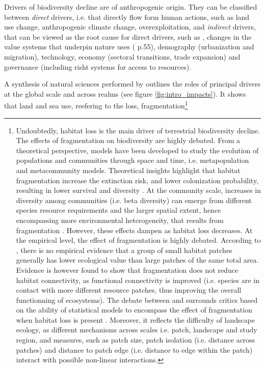 Drivers of biodiversity decline are of anthropogenic origin. They can be classified between \textit{direct} drivers, i.e. that directly flow form human actions, such as land use change, anthropogenic climate change, overexploitation, and \textit{indirect} drivers, that can be viewed as the root cause for direct drivers, such as  , changes in the value systems that underpin nature uses (\cite{ipbes_2022_6417333} p.55), demography (urbanization and migration), technology, economy (sectoral transitions, trade expansion) and governance (including risht systems for access to resources).

A synthesis of natural sciences performed by \cite{ipbes_2022_6417333} outlines the roles of principal drivers at the global scale and across realms (see figure \ref{fig:intro_impacts}).
It shows that land and sea use, reefering to the loss, fragmentation\footnote{Undoubtedly, habitat loss is the main driver of terrestrial biodiversity decline. The effects of fragmentation on biodiversity are highly debated. From a theoretical perspective, models have been developed to study the evolution of populations and communities through space and time, i.e. metapopulation and metacommunity models. Theoretical insights highlight that habitat fragmentation increase the extinction risk, and lower colonization probability, resulting in lower survival and diversity \citep{adler_persistence_1994,hill_habitat_1999, thompson_loss_2017}. At the community scale, increases in diversity among communities (i.e. beta diversity) can emerge from different species resource requirements and the larger spatial extent, hence encompassing more environmental heterogeneity, that results from fragmentation \citep{lasky_reserve_2013, chisholm_species_2018}. However, these effects dampen as habitat loss decreases.  
At the empirical level, the effect of fragmentation is highly debated. According to \cite{fahrig_ecological_2017}, there is no empirical evidence that a group of small habitat patches generally has lower ecological value than large patches of the same total area. Evidence is however found to show that fragmentation does not reduce habitat connectivity, as functional connectivity is improved (i.e. species are in contact with more different resource patches, thus improving the overall functionning of ecosystems). The debate between \cite{fletcher_is_2018} and \cite{fahrig_habitat_2019} surrounds critics based on the ability of statistical models to encompass the effect of fragmentation when habitat loss is present \citep{ruffell_accounting_2016}. Moreover, it reflects the difficulty of landscape ecology, as different mechanisms across scales i.e. patch, landscape and study region, and measures, such as patch size, patch isolation (i.e. distance across patches) and distance to patch edge (i.e. distance to edge within the patch) interact with possible non-linear interactions.}
